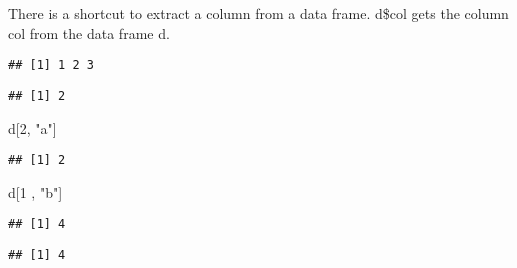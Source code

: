 \documentclass[
]{article}
\newenvironment{Shaded}{\begin{snugshade}}{\end{snugshade}}
\newcommand{\DecValTok}[1]{\textcolor[rgb]{0.00,0.00,0.81}{#1}}
\newcommand{\NormalTok}[1]{#1}
\newcommand{\OperatorTok}[1]{\textcolor[rgb]{0.81,0.36,0.00}{\textbf{#1}}}
\newcommand{\StringTok}[1]{\textcolor[rgb]{0.31,0.60,0.02}{#1}}
\begin{document}
There is a shortcut to extract a column from a data frame. d\$col gets
the column col from the data frame d.~

\begin{Shaded}
\end{Shaded}

\begin{verbatim}
## [1] 1 2 3
\end{verbatim}

\begin{Shaded}
\end{Shaded}

\begin{verbatim}
## [1] 2
\end{verbatim}

\begin{Shaded}
\begin{Highlighting}[]
\NormalTok{d[}\DecValTok{2}\NormalTok{, }\StringTok{"a"}\NormalTok{]}
\end{Highlighting}
\end{Shaded}

\begin{verbatim}
## [1] 2
\end{verbatim}

\begin{Shaded}
\begin{Highlighting}[]
\NormalTok{d[}\DecValTok{1}\NormalTok{ , }\StringTok{"b"}\NormalTok{]}
\end{Highlighting}
\end{Shaded}

\begin{verbatim}
## [1] 4
\end{verbatim}

\begin{Shaded}
\end{Shaded}

\begin{verbatim}
## [1] 4
\end{verbatim}
\end{document}
